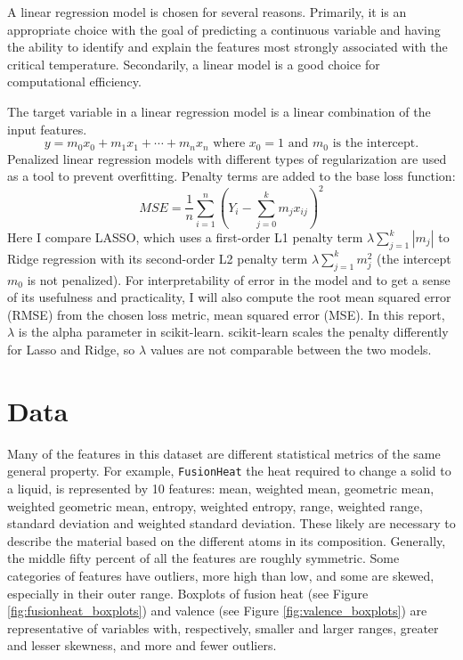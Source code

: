 \documentclass{article}
\begin{document}
A linear regression model is chosen for several reasons. Primarily, it is an appropriate choice with the goal of predicting a continuous variable and having the ability to identify and explain the features most strongly associated with the critical temperature. Secondarily, a linear model is a good choice for computational efficiency.

The target variable in a linear regression model is a linear combination of the input features.
\[ y = m_0x_0 + m_1x_1 + \cdots + m_nx_n \text{ where } x_0 = 1 \text{ and } m_0 \text{ is the intercept.} \]
Penalized linear regression models with different types of regularization are used as a tool to prevent overfitting. Penalty terms are added to the base loss function:
\[ MSE = \frac{1}{n} \sum_{i=1}^{n} \left(Y_i - \sum_{j=0}^{k} m_j x_{ij}\right)^2 \]
Here I compare LASSO, which uses a first-order L1 penalty term \( \lambda \sum_{j=1}^{k} |m_j| \) to Ridge regression with its second-order L2 penalty term \( \lambda \sum_{j=1}^{k} m_j^2 \) (the intercept \( m_0 \) is not penalized). For interpretability of error in the model and to get a sense of its usefulness and practicality, I will also compute the root mean squared error (RMSE) from the chosen loss metric, mean squared error (MSE). In this report, \(\lambda\) is the alpha parameter in scikit-learn. scikit-learn scales the penalty differently for Lasso and Ridge, so \(\lambda\) values are not comparable between the two models.

\section{Data}
Many of the features in this dataset are different statistical metrics of the same general property. For example, \texttt{FusionHeat} the heat required to change a solid to a liquid, is represented by 10 features: mean, weighted mean, geometric mean, weighted geometric mean, entropy, weighted entropy, range, weighted range, standard deviation and weighted standard deviation. These likely are necessary to describe the material based on the different atoms in its composition. Generally, the middle fifty percent of all the features are roughly symmetric. Some categories of features have outliers, more high than low, and some are skewed, especially in their outer range. Boxplots of fusion heat (see Figure \ref{fig:fusionheat_boxplots}) and valence (see Figure \ref{fig:valence_boxplots}) are representative of variables with, respectively, smaller and larger ranges, greater and lesser skewness, and more and fewer outliers.
\end{document}
